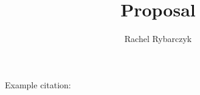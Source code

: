 \documentclass[11pt]{article}
\title{Proposal}
\author{Rachel Rybarczyk}
\begin{document}
\maketitle %
\thispagestyle{empty} %

Example citation: \cite{ex-cite}

\newpage

\newpage





\end{document}
